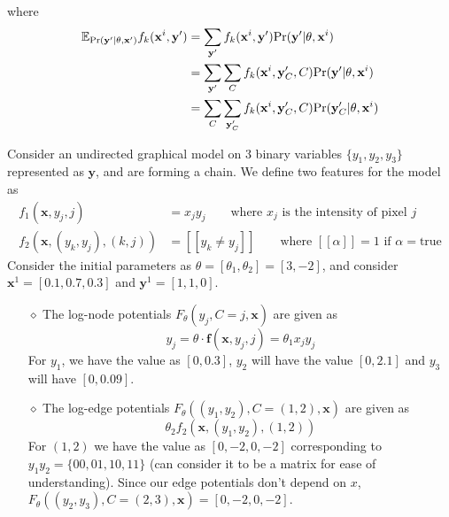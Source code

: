 where 
\begin{equation}
\begin{split}
	\mathbb{E}_{\text{Pr}(\mathbf y'| \theta, \mathbf x')} f_k(\mathbf x^i, \mathbf y') &= \sum_{\mathbf y'}  f_k(\mathbf x^i, \mathbf y')\text{Pr}(\mathbf y'|\theta, \mathbf x^i) \\
	&= \sum_{\mathbf y'} \sum_C f_k(\mathbf x^i, \mathbf y'_C, C)\text{Pr}(\mathbf y'|\theta, \mathbf x^i) \\
	&= \sum_C \sum_{\mathbf y_C'} f_k (\mathbf x^i, \mathbf y_C', C)\text{Pr}(\mathbf y_C'|\theta, \mathbf x^i)
\end{split}
\end{equation}
\begin{exmp}\label{exmp:i-1}
Consider an undirected graphical model on 3 binary variables $\{y_1, y_2, y_3\}$ represented as $\mathbf y$, and are forming a chain. We define two features for the model as
\[
\begin{split}
	f_1(\mathbf x, y_j, j) &= x_jy_j \qquad \text{where $x_j$ is the intensity of pixel $j$} \\
	f_2(\mathbf x, (y_k, y_j), (k,j)) &= [\![ y_k \neq y_j ]\!] \qquad \text{where $[\![\alpha]\!] = 1$ if $\alpha=$true}
\end{split}
\]
Consider the initial parameters as $\theta = [\theta_1, \theta_2] = [3,-2]$, and consider $\mathbf x^1 = [0.1, 0.7, 0.3]$ and $\mathbf y^1 = [1, 1, 0]$. \\
\begin{itemize}
	\item[$\diamond$] The log-node potentials $F_\theta(y_j, C=j, \mathbf x)$ are given as $$y_j = \theta \cdot \mathbf f(\mathbf x, y_j, j) = \theta_1 x_j y_j$$
	For $y_1$, we have the value as $[0, 0.3]$, $y_2$ will have the value $[0, 2.1]$ and $y_3$ will have $[0, 0.09]$.
	\item[$\diamond$] The log-edge potentials $F_\theta((y_1, y_2), C=(1,2), \mathbf x)$ are given as
	\[\theta_2f_2(\mathbf x, (y_1, y_2), (1,2))\]
	For $(1,2)$ we have the value as $[0, -2, 0, -2]$ corresponding to $y_1y_2 = \{00, 01, 10, 11\}$ (can consider it to be a matrix for ease of understanding). Since our edge potentials don't depend on $x$, $F_\theta((y_2,y_3), C=(2,3), \mathbf x) = [0, -2, 0, -2]$. 
\end{itemize}
\end{exmp}
